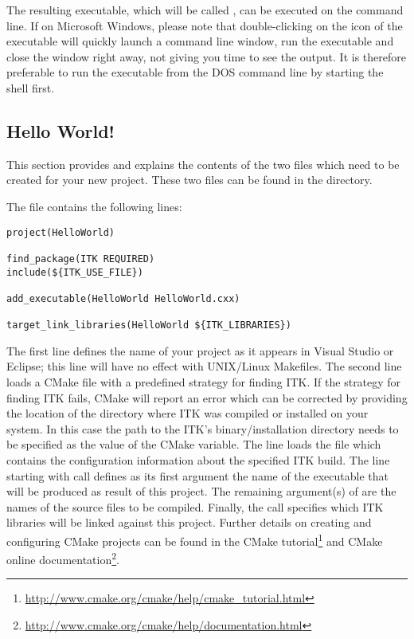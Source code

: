 The resulting executable, which will be called , can be
executed on the command line. If on Microsoft Windows, please note that
double-clicking on the icon of the executable will quickly launch a command line
window, run the executable and close the window right away, not giving you time
to see the output. It is therefore preferable to run the executable from the DOS
command line by starting the  shell first.

\subsection{Hello World!}
\label{sec:HelloWorldITK}


This section provides and explains the contents of the two files which need to
be created for your new project. These two files can be found in the
 directory.

The  file contains the following lines:

\begin{verbatim}
project(HelloWorld)

find_package(ITK REQUIRED)
include(${ITK_USE_FILE})

add_executable(HelloWorld HelloWorld.cxx)

target_link_libraries(HelloWorld ${ITK_LIBRARIES})
\end{verbatim}

The first line defines the name of your project as it appears in Visual Studio
or Eclipse; this line will have no effect with UNIX/Linux Makefiles. The second
line loads a CMake file with a predefined strategy for finding ITK. If the
strategy for finding ITK fails, CMake will report an error which can be
corrected by providing the location of the directory where ITK was compiled or
installed on your system. In this case the path to the ITK's binary/installation
directory needs to be specified as the value of the  CMake
variable. The line  loads the
 file which contains the configuration information about the
specified ITK build. The line starting with  call defines
as its first argument the name of the executable that will be produced
as result of this project. The remaining argument(s) of 
are the names of the source files to be compiled. Finally, the
 call specifies which ITK libraries will be
linked against this project. Further details on creating and configuring CMake
projects can be found in the CMake tutorial\footnote{
\url{http://www.cmake.org/cmake/help/cmake\_tutorial.html}} and CMake online
documentation\footnote{\url{http://www.cmake.org/cmake/help/documentation.html}}.


